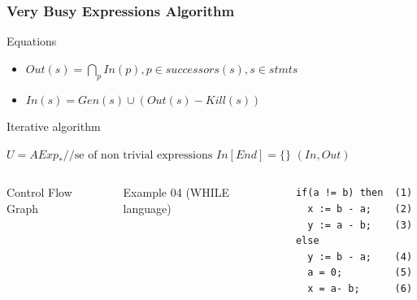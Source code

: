 \begin{frame}[fragile]
	\frametitle{Very Busy Expressions Algorithm}
	
	\begin{block}{Equations}
		\begin{itemize}
			\item $Out(s) = \bigcap_p In(p), p \in successors(s), s \in stmts$
			\item $In(s) = Gen(s) \cup (Out(s) - Kill(s))$  
		\end{itemize}
	\end{block}
	
	\pause
	
	\begin{block}{Iterative algorithm}
          \begin{algorithmic}
              \State $U = AExp_* \text{//se of non trivial expressions}$   
              \State $In[End] = \{\}$ 
              \EndFor
                  \EndFor
              \EndWhile
               $(In, Out)$
          \EndProcedure 
          \end{algorithmic}
	\end{block}
\end{frame}


\begin{frame}[fragile]
    \begin{columns}
    Control Flow Graph
    
    
    
Example 04 (WHILE language)
    
\begin{verbatim}
if(a != b) then  (1)
  x := b - a;    (2)
  y := a - b;    (3)
else    
  y := b - a;    (4) 
  a = 0;         (5) 
  x = a- b;      (6) 
\end{verbatim}
\end{columns}
\end{frame}



